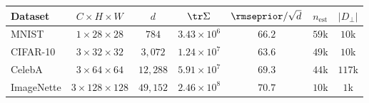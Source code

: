 \begin{tabular}{lcccccc}
\toprule
Dataset & $C\!\times\!H\!\times\!W$ & $d$ & $\tr\Sigma$ & $\rmseprior/\sqrt d$ & $n_{\mathrm{est}}$ & $|D_\perp|$ \\
\midrule
MNIST & $1\!\times\!28\!\times\!28$ & $784$ & $3.43\!\times\!10^{6}$ & $66.2$ & $59$k & $10$k \\
CIFAR-10 & $3\!\times\!32\!\times\!32$ & $3{,}072$ & $1.24\!\times\!10^{7}$ & $63.6$ & $49$k & $10$k \\
CelebA & $3\!\times\!64\!\times\!64$ & $12{,}288$ & $5.91\!\times\!10^{7}$ & $69.3$ & $44$k & $117$k \\
ImageNette & $3\!\times\!128\!\times\!128$ & $49{,}152$ & $2.46\!\times\!10^{8}$ & $70.7$ & $10$k & $1$k \\
\bottomrule
\end{tabular}
